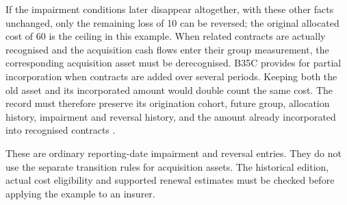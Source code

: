 If the impairment conditions later disappear altogether, with these other
facts unchanged, only the remaining loss of 10 can be reversed; the original
allocated cost of 60 is the ceiling in this example. When related contracts
are actually recognised and the acquisition cash flows enter their group
measurement, the corresponding acquisition asset must be derecognised.
B35C provides for partial incorporation when contracts are added over several
periods. Keeping both the old asset and its incorporated amount would double
count the same cost. The record must therefore preserve its origination cohort,
future group, allocation history, impairment and reversal history, and the
amount already incorporated into recognised contracts
\citep[paragraphs 28C--28F and B35B--B35C]{aasb17}.

These are ordinary reporting-date impairment and reversal entries. They do
not use the separate transition rules for acquisition assets. The historical
edition, actual cost eligibility and supported renewal estimates must be
checked before applying the example to an insurer.

\clearpage
